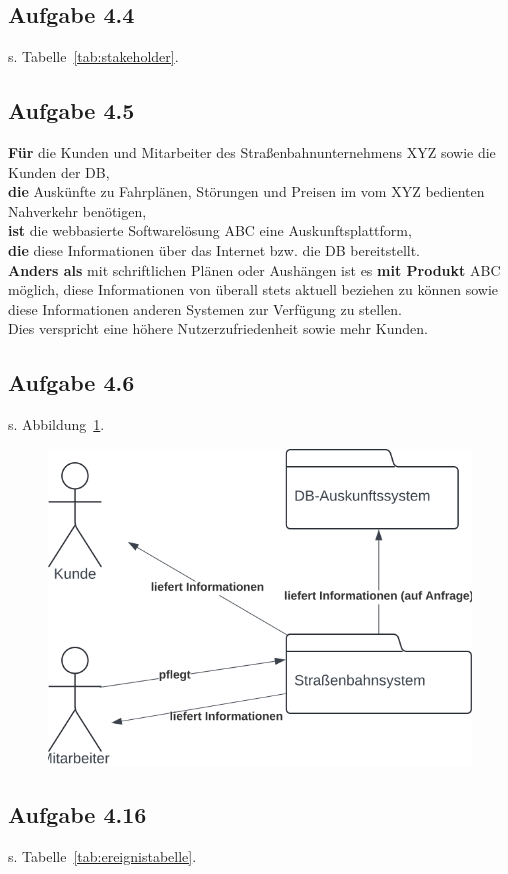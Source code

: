 \subsection{Aufgabe 4.4}
s. Tabelle~\ref{tab:stakeholder}.

\subsection{Aufgabe 4.5}
\textbf{Für} die Kunden und Mitarbeiter des Straßenbahnunternehmens XYZ sowie die Kunden der DB, \\
\textbf{die} Auskünfte zu Fahrplänen, Störungen und Preisen im vom XYZ bedienten Nahverkehr benötigen,\\
\textbf{ist} die webbasierte Softwarelösung ABC eine Auskunftsplattform,\\
\textbf{die} diese Informationen über das Internet bzw. die DB bereitstellt.\\
\textbf{Anders als} mit schriftlichen Plänen oder Aushängen ist es \textbf{mit Produkt} ABC möglich, diese Informationen von überall stets aktuell beziehen zu können sowie diese Informationen anderen Systemen zur Verfügung zu stellen.\\
Dies verspricht eine höhere Nutzerzufriedenheit sowie mehr Kunden.


\subsection{Aufgabe 4.6}

s. Abbildung~\ref{fig:aufgabe4-6}.

\begin{figure}
    \centering
    \includegraphics[scale=0.35]{part one/Requirements Engineering/img/aufgabe4.6}
    \caption{}
    \label{fig:aufgabe4-6}
\end{figure}

\subsection{Aufgabe 4.16}

s. Tabelle~\ref{tab:ereignistabelle}.

